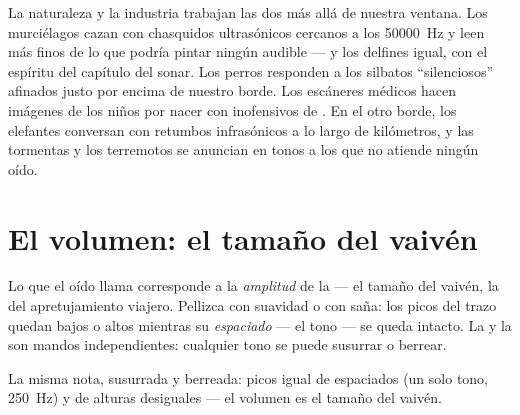 \begin{example}\label{ex:g8:sound-pitch-loudness:beyond}
La naturaleza y la industria trabajan las dos más allá de nuestra
ventana. Los murciélagos cazan con chasquidos ultrasónicos cercanos a
los \qty{50000}{Hz} y leen  más finos de lo que podría pintar
ningún  audible --- y los delfines igual, con el espíritu
del capítulo del sonar. Los perros responden a los silbatos
``silenciosos'' afinados justo por encima de nuestro borde. Los
escáneres médicos hacen imágenes de los niños por nacer con
 inofensivos de . En el otro borde, los
elefantes conversan con retumbos infrasónicos a lo largo de kilómetros,
y las tormentas y los terremotos se anuncian en tonos a los que no
atiende ningún oído.
\end{example}

\section{El volumen: el tamaño del vaivén}

\begin{proposition}\label{prop:g8:sound-pitch-loudness:loudness}
Lo que el oído llama \emph{} corresponde a la
\emph{amplitud} de la  --- el tamaño del
vaivén, la  del apretujamiento viajero. Pellizca con suavidad o
con saña: los picos del trazo quedan bajos o altos mientras su
\emph{espaciado} --- el tono --- se queda intacto. La
 y la  son mandos independientes:
cualquier tono se puede susurrar o berrear.
\end{proposition}

\begin{omfigure}

{\small La misma nota, susurrada y berreada: picos igual de espaciados
(un solo tono, \qty{250}{Hz}) y de alturas desiguales --- el volumen es
el tamaño del vaivén.}
\end{omfigure}


